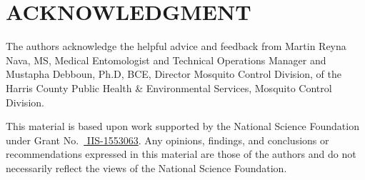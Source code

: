 \documentclass[letterpaper, 10 pt, conference]{ieeeconf}  %
\begin{document}
%

\section*{ACKNOWLEDGMENT}
The authors acknowledge the helpful advice and feedback from Martin Reyna Nava, MS, Medical Entomologist and Technical Operations Manager and Mustapha Debboun, Ph.D, BCE, Director Mosquito Control Division, of the Harris County Public Health \& Environmental Services, Mosquito Control Division.

This material is based upon work supported by the National Science Foundation under Grant No.\ 
\href{http://nsf.gov/awardsearch/showAward?AWD_ID=1553063}{ IIS-1553063}.
Any opinions, findings, and conclusions or recommendations expressed in this material are those of the authors and do not necessarily reflect the views of the National Science Foundation.





%

%
%
%
%
%
%
\end{document}
